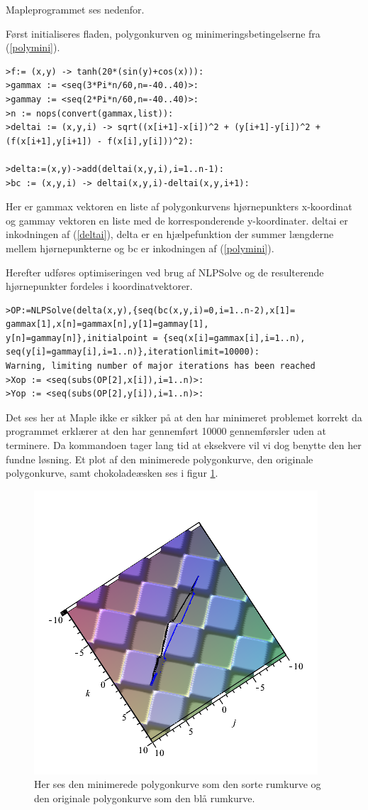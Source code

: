 Mapleprogrammet ses nedenfor.

Først initialiseres fladen, polygonkurven og minimeringsbetingelserne fra (\ref{polymini}).
\begin{lstlisting}[caption=Initialisering]
>f:= (x,y) -> tanh(20*(sin(y)+cos(x))):
>gammax := <seq(3*Pi*n/60,n=-40..40)>:
>gammay := <seq(2*Pi*n/60,n=-40..40)>:
>n := nops(convert(gammax,list)):
>deltai := (x,y,i) -> sqrt((x[i+1]-x[i])^2 + (y[i+1]-y[i])^2 +
(f(x[i+1],y[i+1]) - f(x[i],y[i]))^2):

>delta:=(x,y)->add(deltai(x,y,i),i=1..n-1):
>bc := (x,y,i) -> deltai(x,y,i)-deltai(x,y,i+1):
\end{lstlisting}
Her er gammax vektoren en liste af polygonkurvens hjørnepunkters x-koordinat og gammay vektoren en liste med de korresponderende y-koordinater. deltai er inkodningen af (\ref{deltai}), delta er en hjælpefunktion der summer længderne mellem hjørnepunkterne og bc er inkodningen af (\ref{polymini}).

Herefter udføres optimiseringen ved brug af NLPSolve og de resulterende hjørnepunkter fordeles i koordinatvektorer.
\begin{lstlisting}[caption={Brug af NLPSolve til løsning af (\ref{polymini})}]
>OP:=NLPSolve(delta(x,y),{seq(bc(x,y,i)=0,i=1..n-2),x[1]=
gammax[1],x[n]=gammax[n],y[1]=gammay[1],
y[n]=gammay[n]},initialpoint = {seq(x[i]=gammax[i],i=1..n),
seq(y[i]=gammay[i],i=1..n)},iterationlimit=10000):
Warning, limiting number of major iterations has been reached
>Xop := <seq(subs(OP[2],x[i]),i=1..n)>:
>Yop := <seq(subs(OP[2],y[i]),i=1..n)>:
\end{lstlisting}
Det ses her at Maple ikke er sikker på at den har minimeret problemet korrekt da programmet erklærer at den har gennemført 10000 gennemførsler uden at terminere. Da kommandoen tager lang tid at eksekvere vil vi dog benytte den her fundne løsning. Et plot af den minimerede polygonkurve, den originale polygonkurve, samt chokoladeæsken ses i figur \ref{polyoptimized}.
\begin{figure}
\center
\includegraphics[scale=0.4]{pictures/chokobox_optimized2.png}
\caption{Her ses den minimerede polygonkurve som den sorte rumkurve og den originale polygonkurve som den blå rumkurve.}
\label{polyoptimized}
\end{figure}

